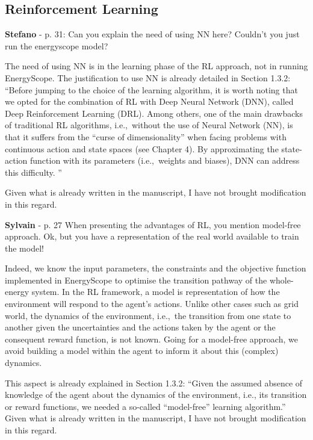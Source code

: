 \documentclass[12pt,a4paper]{article}
\def\ie{i.e.,\ }
\begin{document}
\subsection{Reinforcement Learning}
\label{methodo_RL}

\begin{mdframed}[style=comment] %
{\color{orange} \textbf{Stefano}} - p. 31: Can you explain the need of using NN here? Couldn’t you just run the energyscope model?
\end{mdframed}

\noindent The need of using NN is in the learning phase of the RL approach, not in running EnergyScope. The justification to use NN is already detailed in Section 1.3.2: ``Before jumping to the choice of the learning algorithm, it is worth noting that we opted for the combination of RL with Deep Neural Network (DNN), called Deep Reinforcement Learning (DRL). Among others, one of the main drawbacks of traditional RL algorithms, \ie without the use of Neural Network (NN),  is that it suffers from the ``curse of dimensionality'' when facing problems with continuous action and state spaces (see Chapter 4). By approximating the state-action function with its parameters (\ie weights and biases), DNN can address this difficulty. ''

Given what is already written in the manuscript, I have not brought modification in this regard.

\begin{mdframed}[style=comment] %
{\color{purple} \textbf{Sylvain}} - p. 27 When presenting the advantages of RL, you mention model-free approach. Ok, but you have a representation of the real world available to train the model!
\end{mdframed}

\noindent Indeed, we know the input parameters, the constraints and the objective function implemented in EnergyScope to optimise the transition pathway of the whole-energy system. In the RL framework, a model is representation of how the environment will respond to the agent's actions. Unlike other cases such as grid world, the dynamics of the environment, \ie the transition from one state to another given the uncertainties and the actions taken by the agent or the consequent reward function, is not known.  Going for a model-free approach, we avoid building a model within the agent to inform it about this (complex) dynamics.

This aspect is already explained in Section 1.3.2: ``Given the assumed absence of knowledge of the agent about the dynamics of the environment, i.e., its transition or reward functions, we needed a so-called ``model-free'' learning algorithm.'' Given what is already written in the manuscript, I have not brought modification in this regard.
\end{document}
